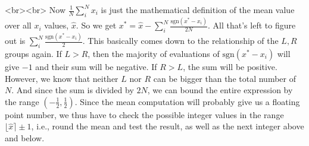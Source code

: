<br><br>
Now $\frac{1}{N}\sum_i^N x_i$ is just the mathematical definition of the mean value over all $x_i$ values, $\hat{x}$. So we get $x^\ast = \hat{x} - \sum_i^N \frac{\text{sgn}(x^\ast-x_i)}{2N}$. All that's left to figure out is $\sum_i^N \frac{\text{sgn}(x^\ast-x_i)}{2}$. This basically comes down to the relationship of the $L,R$ groups again. If $L > R$, then the majority of evaluations of $\text{sgn}(x^\ast-x_i)$ will give $-1$ and their sum will be negative. If $R > L$, the sum will be positive. However, we know that neither $L$ nor $R$ can be bigger than the total number of $N$. And since the sum is divided by $2N$, we can bound the entire expression by the range $(-\frac{1}{2},\frac{1}{2})$. Since the mean computation will probably give us a floating point number, we thus have to check the possible integer values in the range $\lfloor \hat{x} \rceil \pm 1$, i.e., round the mean and test the result, as well as the next integer above and below.